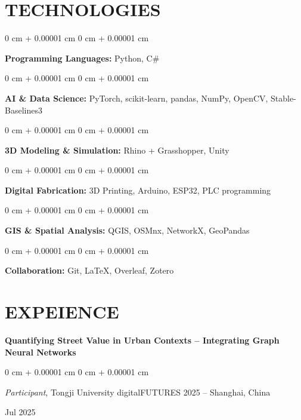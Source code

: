 \documentclass[10pt, letterpaper]{article}
\newenvironment{onecolentry}{
    \begin{adjustwidth}{
        0 cm + 0.00001 cm
    }{
        0 cm + 0.00001 cm
    }
}{
    \end{adjustwidth}
} %
\newenvironment{twocolentry}[2][]{
    \onecolentry
    \def\secondColumn{#2}
    \setcolumnwidth{\fill, 4.5 cm}
    \begin{paracol}{2}
}{
    \switchcolumn \raggedleft \secondColumn
    \end{paracol}
    \endonecolentry
} %
\begin{document}
        \section{TECHNOLOGIES}
        
        \begin{onecolentry}
            \textbf{Programming Languages:} Python, C\#
        \end{onecolentry}
        
        \vspace{0.2 cm}
        
        \begin{onecolentry}
            \textbf{AI \& Data Science:} PyTorch, scikit-learn, pandas, NumPy, OpenCV, Stable-Baselines3
        \end{onecolentry}
        
        \vspace{0.2 cm}
        
        \begin{onecolentry}
            \textbf{3D Modeling \& Simulation:} Rhino + Grasshopper, Unity
        \end{onecolentry}
        
        \vspace{0.2 cm}
        
        \begin{onecolentry}
            \textbf{Digital Fabrication:} 3D Printing, Arduino, ESP32, PLC programming
        \end{onecolentry}
        
        \vspace{0.2 cm}
        
        \begin{onecolentry}
            \textbf{GIS \& Spatial Analysis:} QGIS, OSMnx, NetworkX, GeoPandas
        \end{onecolentry}
        
        \vspace{0.2 cm}
        
        
        \begin{onecolentry}
            \textbf{Collaboration:} Git, LaTeX, Overleaf, Zotero
        \end{onecolentry}

    
    \section{EXPEIENCE}
    \textbf{Quantifying Street Value in Urban Contexts -- Integrating Graph Neural Networks} \\
    \begin{twocolentry}{
    Jul 2025
    }
    \textit{Participant}, Tongji University digitalFUTURES 2025 -- Shanghai, China
    \end{twocolentry}
    
\end{document}
